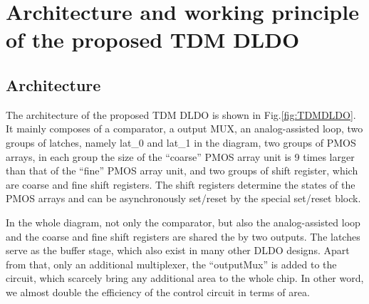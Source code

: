 \documentclass[journal]{IEEEtran}
\begin{document}
\section{Architecture and working principle of the proposed TDM DLDO}
\subsection{Architecture}
The architecture of the proposed TDM DLDO is shown in Fig.\ref{fig:TDMDLDO}. It mainly composes of a comparator, a output MUX, an analog-assisted loop, two groups of latches, namely lat\_0 and lat\_1 in the diagram, two groups of PMOS arrays, in each group the size of the ``coarse'' PMOS array unit is 9 times larger than that of the ``fine'' PMOS array unit, and two groups of shift register, which are coarse and fine shift registers. The shift registers determine the states of the PMOS arrays and can be asynchronously set/reset by the special set/reset block.  

In the whole diagram, not only the comparator, but also the analog-assisted loop and the coarse and fine shift registers are shared the by two outputs. The latches serve as the buffer stage, which also exist in many other DLDO designs\cite{AALDO,AALDO1}. Apart from that, only an additional multiplexer, the ``outputMux'' is added to the circuit, which scarcely bring any additional area to the whole chip. In other word, we almost double the efficiency of the control circuit in terms of area.
\end{document}
